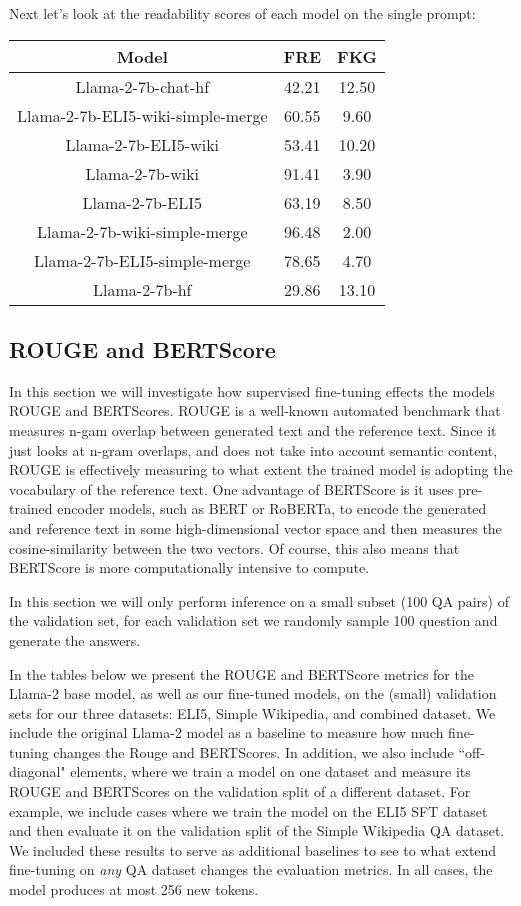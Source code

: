 \documentclass[11pt, oneside]{article}   	%
\begin{document}
Next let's look at the readability scores of each model on the single prompt:

\begin{center}
\begin{tabular}{c|c|c}
    \hline
    \textbf{Model} & \textbf{FRE}& \textbf{FKG} \\
    \hline
    Llama-2-7b-chat-hf &  42.21 & 12.50 \\ 
    Llama-2-7b-ELI5-wiki-simple-merge & 60.55 & 9.60  \\
    Llama-2-7b-ELI5-wiki &  53.41 &  10.20 \\
    Llama-2-7b-wiki &  91.41 & 3.90 \\
    Llama-2-7b-ELI5 &  63.19 & 8.50 \\
    Llama-2-7b-wiki-simple-merge &  96.48& 2.00  \\
    Llama-2-7b-ELI5-simple-merge & 78.65 & 4.70  \\
    Llama-2-7b-hf & 29.86 &13.10 \\
    \hline
\end{tabular}
\end{center}

\subsection{ROUGE and BERTScore}
In this section we will investigate how supervised fine-tuning effects the models ROUGE and BERTScores.
ROUGE is a well-known automated benchmark that measures n-gam overlap between generated text and the reference text.
Since it just looks at n-gram overlaps, and does not take into account semantic content, ROUGE is effectively measuring to what extent the trained model is adopting the vocabulary of the reference text.
One advantage of BERTScore is it uses pre-trained encoder models, such as BERT or RoBERTa, to encode the generated and reference text in some high-dimensional vector space and then measures the cosine-similarity between the two vectors.
Of course, this also means that BERTScore is more computationally intensive to compute.

In this section we will only perform inference on a small subset (100 QA pairs) of the validation set, for each validation set we randomly sample 100 question and generate the answers.

In the tables below we present the ROUGE and BERTScore metrics for the Llama-2 base model, as well as our fine-tuned models, on the (small) validation sets for our three datasets: ELI5, Simple Wikipedia, and combined dataset.
We include the original Llama-2 model as a baseline to measure how much fine-tuning changes the Rouge and BERTScores.
In addition, we also include ``off-diagonal" elements, where we train a model on one dataset and measure its ROUGE and BERTScores on the validation split of a different dataset.
For example, we include cases where we train the model on the ELI5 SFT dataset and then evaluate it on the validation split of the Simple Wikipedia QA dataset.
We included these results to serve as additional baselines to see to what extend fine-tuning on \textit{any} QA dataset changes the evaluation metrics.
In all cases, the model produces at most 256 new tokens.
\end{document}
